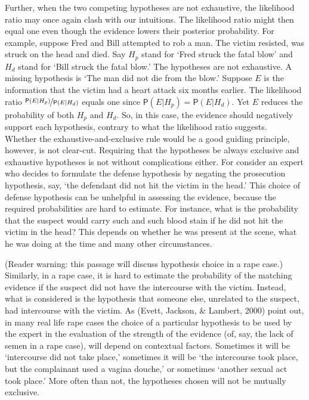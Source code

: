 \documentclass[
  10pt,
  dvipsnames,enabledeprecatedfontcommands]{scrartcl}
\newcommand{\pr}[1]{\mathsf{P}(#1)}
\begin{document}
Further, when the two competing hypotheses are not exhaustive, the
likelihood ratio may once again clash with our intuitions. The
likelihood ratio might then equal one even though the evidence lowers
their posterior probability. For example, suppose Fred and Bill
attempted to rob a man. The victim resisted, was struck on the head and
died. Say \(H_p\) stand for `Fred struck the fatal blow' and \(H_d\)
stand for `Bill struck the fatal blow.' The hypotheses are not
exhaustive. A missing hypothesis is `The man did not die from the blow.'
Suppose \(E\) is the information that the victim had a heart attack six
months earlier. The likelihood ratio
\(\nicefrac{\pr{E \vert H_p}}{\pr{E \vert H_d}}\) equals one since
\(\pr{E\vert H_p}=\pr{E\vert H_d}\). Yet \(E\) reduces the probability
of both \(H_p\) and \(H_d\). So, in this case, the evidence should
negatively support each hypothesis, contrary to what the likelihood
ratio suggests.\\
Whether the exhaustive-and-exclusive rule would be a good guiding
principle, however, is not clear-cut. Requiring that the hypotheses be
always exclusive and exhaustive hypotheses is not without complications
either. For consider an expert who decides to formulate the defense
hypothesis by negating the prosecution hypothesis, say, `the defendant
did not hit the victim in the head.' This choice of defense hypothesis
can be unhelpful in assessing the evidence, because the required
probabilities are hard to estimate. For instance, what is the
probability that the suspect would carry such and such blood stain if he
did not hit the victim in the head? This depends on whether he was
present at the scene, what he was doing at the time and many other
circumstances.

(Reader warning: this passage will discuss hypothesis choice in a rape
case.) Similarly, in a rape case, it is hard to estimate the probability
of the matching evidence if the suspect did not have the intercourse
with the victim. Instead, what is considered is the hypothesis that
someone else, unrelated to the suspect, had intercourse with the victim.
As (Evett, Jackson, \& Lambert, 2000) point out, in many real life rape
cases the choice of a particular hypothesis to be used by the expert in
the evaluation of the strength of the evidence (of, say, the lack of
semen in a rape case), will depend on contextual factors. Sometimes it
will be `intercourse did not take place,' sometimes it will be `the
intercourse took place, but the complainant used a vagina douche,' or
sometimes `another sexual act took place.' More often than not, the
hypotheses chosen will not be mutually exclusive.
\end{document}
